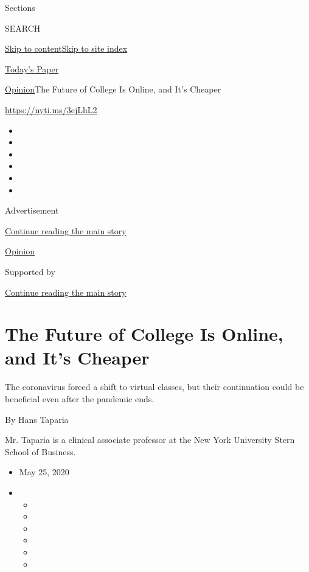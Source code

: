 Sections

SEARCH

\protect\hyperlink{site-content}{Skip to
content}\protect\hyperlink{site-index}{Skip to site index}

\href{https://myaccount.nytimes3xbfgragh.onion/auth/login?response_type=cookie\&client_id=vi}{}

\href{https://www.nytimes3xbfgragh.onion/section/todayspaper}{Today's
Paper}

\href{/section/opinion}{Opinion}\textbar{}The Future of College Is
Online, and It's Cheaper

\url{https://nyti.ms/3ejLhL2}

\begin{itemize}
\item
\item
\item
\item
\item
\item
\end{itemize}

Advertisement

\protect\hyperlink{after-top}{Continue reading the main story}

\href{/section/opinion}{Opinion}

Supported by

\protect\hyperlink{after-sponsor}{Continue reading the main story}

\hypertarget{the-future-of-college-is-online-and-its-cheaper}{%
\section{The Future of College Is Online, and It's
Cheaper}\label{the-future-of-college-is-online-and-its-cheaper}}

The coronavirus forced a shift to virtual classes, but their
continuation could be beneficial even after the pandemic ends.

By Hans Taparia

Mr. Taparia is a clinical associate professor at the New York University
Stern School of Business.

\begin{itemize}
\item
  May 25, 2020
\item
  \begin{itemize}
  \item
  \item
  \item
  \item
  \item
  \item
  \end{itemize}
\end{itemize}

